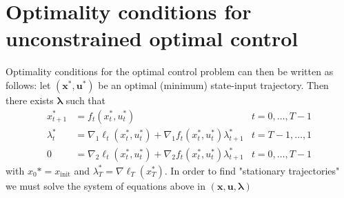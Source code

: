 \documentclass[openany]{book}
\theoremstyle{definition}
\theoremstyle{remark}
\begin{document}
\section{Optimality conditions for unconstrained optimal control}
Optimality conditions for the optimal control problem can then be written as follows: let $(\mathbf{x}^*,\mathbf{u}^*)$ be an optimal (minimum) state-input trajectory. Then there exists $\boldsymbol{\lambda}$ such that
\begin{align*}
    x_{t+1}^* & =f_t(x_t^*,u_t^*) \qquad &t = 0,\dots,T-1 \\
    \lambda_t^* & = \nabla_1\ell_t(x_t^*,u_t^*)+\nabla_1f_t(x_t^*,u_t^*)\lambda^*_{t+1} & t=T-1,\dots,1    \\
     0 & =  \nabla_2\ell_t(x_t^*,u_t^*)+\nabla_2f_t(x_t^*,u_t^*)\lambda_{t+1}^* & t = 0,\dots,T-1
\end{align*}
with $x_0*=x_{\text{init}}$ and $\lambda_T^* = \nabla\ell_T(x_T^*)$. In order to find "stationary trajectories" we must solve the system of equations above in $(\mathbf{x},\mathbf{u},\boldsymbol{\lambda})$
\end{document}
